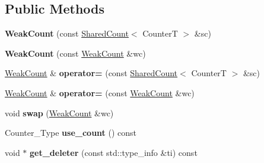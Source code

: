 \subsection*{Public Methods}
\begin{DoxyCompactItemize}
\item 
\mbox{\label{classcugar_1_1internals_1_1_weak_count_a80668f04da0bc3b06a820ee4bd236f29}} 
{\bfseries Weak\+Count} (const \hyperlink{classcugar_1_1internals_1_1_shared_count}{Shared\+Count}$<$ CounterT $>$ \&sc)
\item 
\mbox{\label{classcugar_1_1internals_1_1_weak_count_a0bd9a8982f58fdd85c2ca31285564e10}} 
{\bfseries Weak\+Count} (const \hyperlink{classcugar_1_1internals_1_1_weak_count}{Weak\+Count} \&wc)
\item 
\mbox{\label{classcugar_1_1internals_1_1_weak_count_a3bb59281655c657304d7469a12fdec41}} 
\hyperlink{classcugar_1_1internals_1_1_weak_count}{Weak\+Count} \& {\bfseries operator=} (const \hyperlink{classcugar_1_1internals_1_1_shared_count}{Shared\+Count}$<$ CounterT $>$ \&sc)
\item 
\mbox{\label{classcugar_1_1internals_1_1_weak_count_a69a891d1c92dd31ac1c6fb59ef1ab478}} 
\hyperlink{classcugar_1_1internals_1_1_weak_count}{Weak\+Count} \& {\bfseries operator=} (const \hyperlink{classcugar_1_1internals_1_1_weak_count}{Weak\+Count} \&wc)
\item 
\mbox{\label{classcugar_1_1internals_1_1_weak_count_a861d47a5eb760451f845e26b74c759ac}} 
void {\bfseries swap} (\hyperlink{classcugar_1_1internals_1_1_weak_count}{Weak\+Count} \&wc)
\item 
\mbox{\label{classcugar_1_1internals_1_1_weak_count_a0985d32c1268585ddfedfc550d676ee1}} 
Counter\+\_\+\+Type {\bfseries use\+\_\+count} () const
\item 
\mbox{\label{classcugar_1_1internals_1_1_weak_count_a49059c59780ce6c22789d9259c98a148}} 
void $\ast$ {\bfseries get\+\_\+deleter} (const std\+::type\+\_\+info \&ti) const
\end{DoxyCompactItemize}
